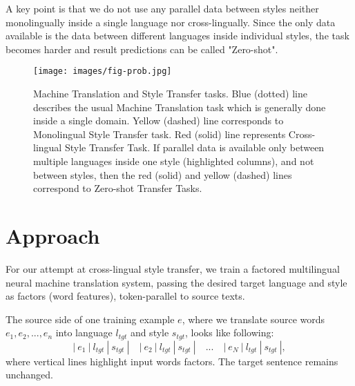 \documentclass[11pt,a4paper]{article}
\begin{document}

A key point is that we do not use any parallel data between styles neither monolingually inside a single language nor cross-lingually. Since the only data available is the data between different languages inside individual styles, the task becomes harder and result predictions can be called "Zero-shot".

\begin{figure}[]
    \texttt{[image: images/fig-prob.jpg]}
  \caption{\small Machine Translation and Style Transfer tasks. Blue (dotted) line describes the usual Machine Translation task which is generally done inside a single domain. Yellow (dashed) line corresponds to Monolingual Style Transfer task. Red (solid) line represents Cross-lingual Style Transfer Task. If parallel data is available only between multiple languages inside one style (highlighted columns), and not between styles, then the red (solid) and yellow (dashed) lines correspond to Zero-shot Transfer Tasks.
      }
  \label{fig-problem}
\end{figure}


\section{Approach}
\label{sec:approach}

For our attempt at cross-lingual style transfer, we train a factored multilingual neural machine translation system, passing the desired target language and style as factors (word features), token-parallel to source texts. 

The source side of one training example $e$, where we translate source words $e_1, e_2, ..., e_n$ into language $l_{tgt}$ and style $s_{tgt}$, looks like following: 
$$
| \>e_1 \>|\> l_{tgt} \>|\> s_{tgt} \>| \quad 
| \>e_2 \>|\> l_{tgt} \>|\> s_{tgt} \>| \quad
...  \quad
|\> e_N \>|\> l_{tgt} \>|\> s_{tgt} \>|,
$$
where vertical lines highlight input words factors.  The target sentence remains unchanged.
\end{document}

